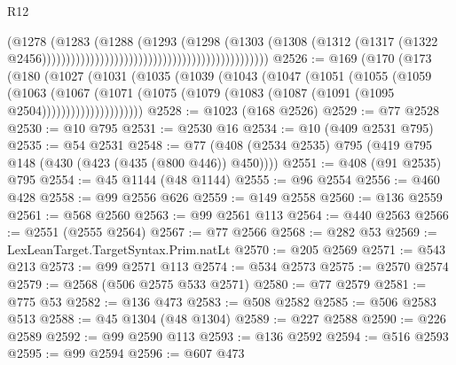 \begin{lexlean}{R12}
\begin{coremodule}
                                                                              (@1278
                                                                                (@1283
                                                                                  (@1288
                                                                                    (@1293
                                                                                      (@1298
                                                                                        (@1303
                                                                                          (@1308
                                                                                            (@1312
                                                                                              (@1317
                                                                                                (@1322
                                                                                                  @2456)))))))))))))))))))))))))))))))))))))))))))))))
@2526 := @169
    (@170
      (@173
        (@180
          (@1027
            (@1031
              (@1035
                (@1039
                  (@1043
                    (@1047
                      (@1051
                        (@1055
                          (@1059
                            (@1063
                              (@1067
                                (@1071
                                  (@1075
                                    (@1079 (@1083 (@1087 (@1091 (@1095 @2504)))))))))))))))))))))
@2528 := @1023 (@168 @2526)
@2529 := @77 @2528
@2530 := @10 @795
@2531 := @2530 @16
@2534 := @10 (@409 @2531 @795)
@2535 := @54 @2531
@2548 := @77 (@408 (@2534 @2535) @795 (@419 @795 @148 (@430 (@423 (@435 (@800 @446)) @450))))
@2551 := @408 (@91 @2535) @795
@2554 := @45 @1144 (@48 @1144)
@2555 := @96 @2554
@2556 := @460 @428
@2558 := @99 @2556 @626
@2559 := @149 @2558
@2560 := @136 @2559
@2561 := @568 @2560
@2563 := @99 @2561 @113
@2564 := @440 @2563
@2566 := @2551 (@2555 @2564)
@2567 := @77 @2566
@2568 := @282 @53
@2569 := LexLeanTarget.TargetSyntax.Prim.natLt
@2570 := @205 @2569
@2571 := @543 @213
@2573 := @99 @2571 @113
@2574 := @534 @2573
@2575 := @2570 @2574
@2579 := @2568 (@506 @2575 @533 @2571)
@2580 := @77 @2579
@2581 := @775 @53
@2582 := @136 @473
@2583 := @508 @2582
@2585 := @506 @2583 @513
@2588 := @45 @1304 (@48 @1304)
@2589 := @227 @2588
@2590 := @226 @2589
@2592 := @99 @2590 @113
@2593 := @136 @2592
@2594 := @516 @2593
@2595 := @99 @2594
@2596 := @607 @473

\end{coremodule}
\end{lexlean}
